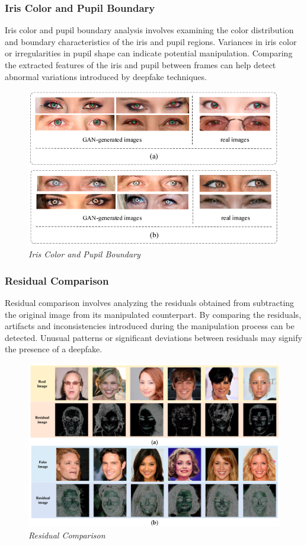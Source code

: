 \subsubsection{Iris Color and Pupil Boundary}

Iris color and pupil boundary analysis involves examining the color distribution and boundary characteristics of the iris and pupil regions. Variances in iris color or irregularities in pupil shape can indicate potential manipulation. Comparing the extracted features of the iris and pupil between frames can help detect abnormal variations introduced by deepfake techniques.
\begin{figure}[htbp]
    \centering
    \includegraphics[width=5in]{img/pupil.png}
    \caption{\textit{Iris Color and Pupil Boundary}}
\end{figure}


\subsubsection{Residual Comparison}

Residual comparison involves analyzing the residuals obtained from subtracting the original image from its manipulated counterpart. By comparing the residuals, artifacts and inconsistencies introduced during the manipulation process can be detected. Unusual patterns or significant deviations between residuals may signify the presence of a deepfake.
\begin{figure}[htbp]
    \centering
    \includegraphics[width=5in]{img/residual.png}
    \caption{\textit{Residual Comparison}}
\end{figure}


